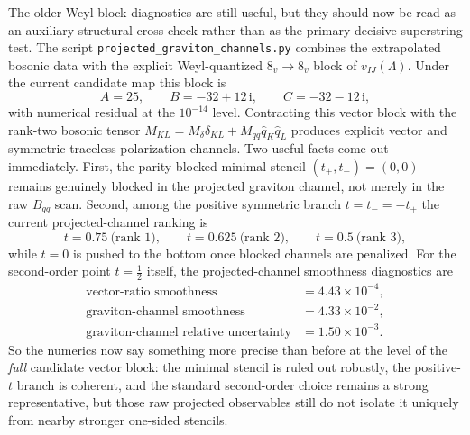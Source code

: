 \documentclass[11pt]{article}
\numberwithin{equation}{section}
\newcommand{\ii}{\mathrm{i}}
\begin{document}
The older Weyl-block diagnostics are still useful, but they should now be read
as an auxiliary structural cross-check rather than as the primary decisive
superstring test. The script \texttt{projected\_graviton\_channels.py} combines
the extrapolated bosonic data with the explicit Weyl-quantized $8_v\to 8_v$
block of $v_{IJ}(\Lambda)$. Under the current candidate map this block is
\begin{equation}
\label{eq:s15-1-039}
A=25,
\qquad
B=-32+12\,\ii,
\qquad
C=-32-12\,\ii,
\end{equation}
with numerical residual at the $10^{-14}$ level. Contracting this vector block with the rank-two bosonic tensor
\(
M_{KL}=M_\delta \delta_{KL}+M_{qq}\hat q_K\hat q_L
\)
produces explicit vector and symmetric-traceless polarization channels. Two useful facts come out immediately. First, the parity-blocked minimal stencil $(t_+,t_-)=(0,0)$ remains genuinely blocked in the projected graviton channel, not merely in the raw $B_{qq}$ scan. Second, among the positive symmetric branch $t=t_-=-t_+$ the current projected-channel ranking is
\begin{equation}
\label{eq:s15-1-040}
t=0.75 \ \text{(rank 1)},\qquad
t=0.625 \ \text{(rank 2)},\qquad
t=0.5 \ \text{(rank 3)},
\end{equation}
while $t=0$ is pushed to the bottom once blocked channels are penalized. For the second-order point $t=\frac12$ itself, the projected-channel smoothness diagnostics are
\begin{equation}
\label{eq:s15-1-041}
\begin{aligned}
\text{vector-ratio smoothness} &= 4.43\times 10^{-4},\\
\text{graviton-channel smoothness} &= 4.33\times 10^{-2},\\
\text{graviton-channel relative uncertainty} &= 1.50\times 10^{-3}.
\end{aligned}
\end{equation}
So the numerics now say something more precise than before at the level of the \emph{full} candidate vector block: the minimal stencil is ruled out robustly, the positive-$t$ branch is coherent, and the standard second-order choice remains a strong representative, but those raw projected observables still do not isolate it uniquely from nearby stronger one-sided stencils.
\end{document}
